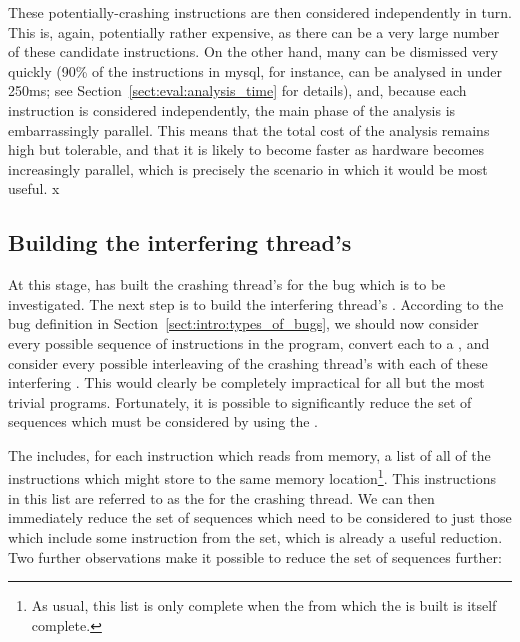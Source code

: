 These potentially-crashing instructions are then considered
independently in turn.  This is, again, potentially rather expensive,
as there can be a very large number of these candidate instructions.
On the other hand, many can be dismissed very quickly (90\% of the
instructions in mysql, for instance, can be analysed in under 250ms;
see Section~\ref{sect:eval:analysis_time} for details), and, because
each instruction is considered independently, the main phase of the
analysis is embarrassingly parallel.  This means that the total cost
of the analysis remains high but tolerable, and that it is likely to
become faster as hardware becomes increasingly parallel, which is
precisely the scenario in which it would be most useful.
x
\subsection{Building the interfering thread's \StateMachines}
\label{sect:derive:write_side}

At this stage, {\technique} has built the crashing thread's
{\StateMachine} for the bug which is to be investigated.  The next
step is to build the interfering thread's {\StateMachine}.  According
to the bug definition in Section~\ref{sect:intro:types_of_bugs}, we
should now consider every possible sequence of \backref{$\alpha$}
instructions in the program, convert each to a {\StateMachine}, and
consider every possible interleaving of the crashing thread's
{\StateMachine} with each of these interfering {\StateMachines}.  This
would clearly be completely impractical for all but the most trivial
programs.  Fortunately, it is possible to significantly reduce the set
of sequences which must be considered by using the .

The  includes, for each instruction which reads
from memory, a list of all of the instructions which might store to
the same memory location\footnote{As usual, this list is only complete
  when the  from which the  is built is itself complete.}.  This instructions in this
list are referred to as the  for the
crashing thread.  We can then immediately reduce the set of sequences
which need to be considered to just those which include some
instruction from the  set, which is
already a useful reduction.  Two further observations make it possible
to reduce the set of sequences further:

